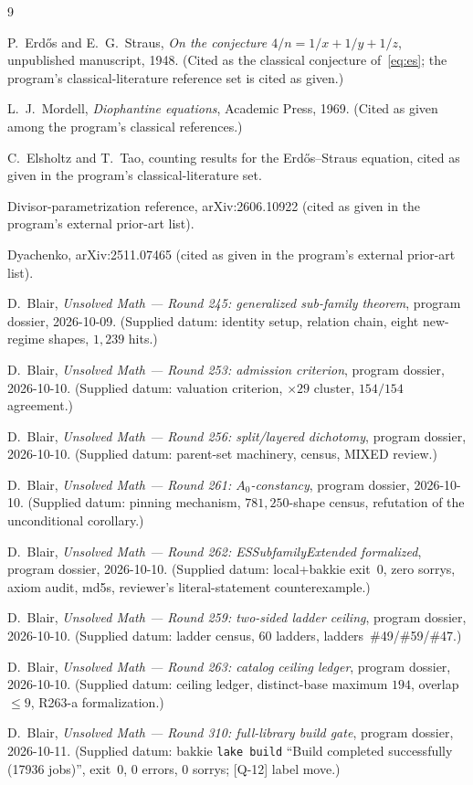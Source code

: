 \documentclass[11pt,a4paper]{article}
\theoremstyle{definition}
\begin{document}
\begin{thebibliography}{9}

P.~Erd\H{o}s and E.~G.~Straus,
\emph{On the conjecture $4/n=1/x+1/y+1/z$},
unpublished manuscript, 1948.
(Cited as the classical conjecture of~\eqref{eq:es}; the program's
classical-literature reference set is cited as given.)

L.~J.~Mordell,
\emph{Diophantine equations},
Academic Press, 1969.
(Cited as given among the program's classical references.)

C.~Elsholtz and T.~Tao,
counting results for the Erd\H{o}s--Straus equation,
cited as given in the program's classical-literature set.

Divisor-parametrization reference, arXiv:2606.10922
(cited as given in the program's external prior-art list).

Dyachenko, arXiv:2511.07465
(cited as given in the program's external prior-art list).

D.~Blair,
\emph{Unsolved Math --- Round 245: generalized sub-family theorem},
program dossier, 2026-10-09.
(Supplied datum: identity setup, relation chain, eight new-regime
shapes, $1{,}239$ hits.)

D.~Blair,
\emph{Unsolved Math --- Round 253: admission criterion},
program dossier, 2026-10-10.
(Supplied datum: valuation criterion, $\times29$ cluster,
$154/154$ agreement.)

D.~Blair,
\emph{Unsolved Math --- Round 256: split/layered dichotomy},
program dossier, 2026-10-10.
(Supplied datum: parent-set machinery, census, MIXED review.)

D.~Blair,
\emph{Unsolved Math --- Round 261: $A_0$-constancy},
program dossier, 2026-10-10.
(Supplied datum: pinning mechanism, $781{,}250$-shape census,
refutation of the unconditional corollary.)

D.~Blair,
\emph{Unsolved Math --- Round 262: ESSubfamilyExtended formalized},
program dossier, 2026-10-10.
(Supplied datum: local+bakkie exit~0, zero sorrys, axiom audit,
md5s, reviewer's literal-statement counterexample.)

D.~Blair,
\emph{Unsolved Math --- Round 259: two-sided ladder ceiling},
program dossier, 2026-10-10.
(Supplied datum: ladder census, $60$ ladders, ladders~\#49/\#59/\#47.)

D.~Blair,
\emph{Unsolved Math --- Round 263: catalog ceiling ledger},
program dossier, 2026-10-10.
(Supplied datum: ceiling ledger, distinct-base maximum $194$,
overlap $\le9$, R263-a formalization.)

D.~Blair,
\emph{Unsolved Math --- Round 310: full-library build gate},
program dossier, 2026-10-11.
(Supplied datum: bakkie \texttt{lake build} ``Build completed
successfully (17936 jobs)'', exit~0, $0$ errors, $0$ sorrys;
[Q-12] label move.)

\end{thebibliography}
\end{document}
